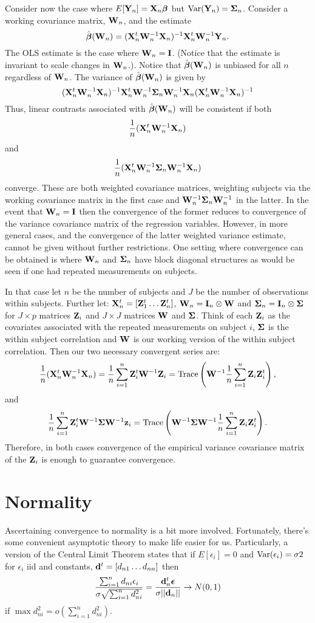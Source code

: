 Consider now the case where $E[\mathbf{Y}_n] = \mathbf{X}_n\boldsymbol{\beta}$ but $\mbox{Var}(\mathbf{Y}_n) = \boldsymbol{\Sigma}_n$. Consider
a working covariance matrix, $\mathbf{W}_n$, and the estimate
$$
\hat {\boldsymbol{\beta}}(\mathbf{W}_n) = (\mathbf{X}^t_n \mathbf{W}^{-1}_n \mathbf{X}_n)^{-1} \mathbf{X}^t_n \mathbf{W}^{-1}_n \mathbf{Y}_n.
$$
The OLS estimate is the case where $\mathbf{W}_n = \mathbf{I}$. (Notice that the estimate is invariant to scale
changes in $\mathbf{W}_n$.). Notice that $\hat {\boldsymbol{\beta}}(\mathbf{W}_n)$ is unbiased for all $n$ regardless of $\mathbf{W}_n$.
The variance of $\hat {\boldsymbol{\beta}}(\mathbf{W}_n)$ is given by
$$
(\mathbf{X}^t_n \mathbf{W}^{-1}_n \mathbf{X}_n)^{-1} \mathbf{X}^t_n \mathbf{W}^{-1}_n \boldsymbol{\Sigma}_n  \mathbf{W}^{-1}_n \mathbf{X}_n (\mathbf{X}^t_n \mathbf{W}^{-1}_n \mathbf{X}_n)^{-1}
$$
Thus, linear contrasts associated with $\hat {\boldsymbol{\beta}}(\mathbf{W}_n)$ will be consistent if both
$$
\frac{1}{n}(\mathbf{X}^t_n \mathbf{W}^{-1}_n \mathbf{X}_n)
$$
and
$$
\frac{1}{n}(\mathbf{X}^t_n \mathbf{W}^{-1}_n \boldsymbol{\Sigma}_n  \mathbf{W}^{-1}_n \mathbf{X}_n)
$$
converge. These are both weighted covariance matrices, weighting subjects via 
the working covariance matrix in the first case and $\mathbf{W}^{-1}_n \boldsymbol{\Sigma}_n  \mathbf{W}^{-1}_n$ in the
latter. In the event that $\mathbf{W}_n = \mathbf{I}$ then the convergence of the former reduces to
convergence of the variance covariance matrix of the regression variables. However,
in more general cases, and the convergence of the latter weighted variance estimate,
cannot be given without further restrictions. 
One setting where convergence can be obtained is where $\mathbf{W}_n$ and
$\boldsymbol{\Sigma}_n$ have block diagonal structures as would be seen if one had repeated measurements
on subjects. 

In that case let $n$ be the number of subjects and $J$ be the number of observations within
subjects. Further let:
$\mathbf{X}_n^t = [\mathbf{Z}_1^t \ldots \mathbf{Z}_n^t]$, $\mathbf{W}_n = \mathbf{I}_{n} \otimes \mathbf{W}$ and $\boldsymbol{\Sigma}_n = \mathbf{I}_{n} \otimes \boldsymbol{\Sigma}$ for 
$J \times p$ matrices $\mathbf{Z}_i$ and $J\times J$
matrices $\mathbf{W}$ and $\boldsymbol{\Sigma}$. Think of each $\mathbf{Z}_i$ as the covariates associated with the 
repeated measurements on subject $i$, $\boldsymbol{\Sigma}$ is the within subject correlation and
$\mathbf{W}$ is our working version of the within subject correlation. Then our two necessary convergent series are:
$$
\frac{1}{n}(\mathbf{X}^t_n \mathbf{W}^{-1}_n \mathbf{X}_n) = \frac{1}{n} \sum_{i=1}^n \mathbf{Z}_i^t \mathbf{W}^{-1} \mathbf{Z}_i
=
 \mbox{Trace}\left(\mathbf{W}^{-1}\frac{1}{n}\sum_{i=1}^n \mathbf{Z}_i \mathbf{Z}_i^t \right)
,
$$
and
$$
\frac{1}{n} \sum_{i=1}^n \mathbf{Z}_i^t \mathbf{W}^{-1}\boldsymbol{\Sigma}\mathbf{W}^{-1} \mathbf{z}_i = 
 \mbox{Trace}\left( \mathbf{W}^{-1}\boldsymbol{\Sigma}\mathbf{W}^{-1} \frac{1}{n} \sum_{i=1}^n \mathbf{Z}_i\mathbf{Z}_i^t \right). 
$$
Therefore, in both cases convergence of the 
empirical variance covariance matrix of the $\mathbf{Z}_i$ is enough
to guarantee convergence.


\section{Normality}
Ascertaining convergence to normality is a bit more involved.
Fortunately, there's some convenient asymptotic theory to 
make life easier for us. Particularly, a version of the
Central Limit Theorem states that if $E[\epsilon_i] = 0$ and
$\mbox{Var}(\epsilon_i) = \sigma2$ for $\epsilon_i$ iid and constants, $\mathbf{d}^t
= [d_{n1} \ldots d_{nn}]$ then
$$
\frac{\sum_{i=1}^n d_{ni} \epsilon_i}{\sigma \sqrt{\sum_{i=1}^n d_{ni}^2 }}
=  \frac{ \mathbf{d}_n ^ t \boldsymbol{\epsilon} }{\sigma|| \mathbf{d}_n ||} \rightarrow N(0, 1)
$$
if $\max d_{ni}^2 = o(\sum_{i=1}^n d_{ni}^2)$.

